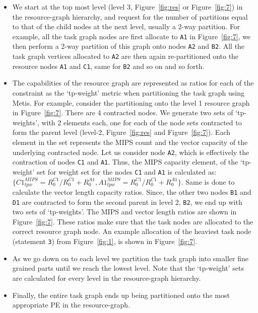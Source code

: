 \begin{itemize}

\item We start at the top most level (level 3, Figure~\ref{fig:res} or
  Figure~\ref{fig:7}) in the resource-graph hierarchy, and request for
  the number of partitions equal to that of the child nodes at the next
  level, usually a 2-way partition. For example, all the task graph
  nodes are first allocate to \texttt{A1} in Figure~\ref{fig:7}, we then
  perform a 2-way partition of this graph onto nodes \texttt{A2} and
  \texttt{B2}. All the task graph vertices allocated to \texttt{A2} are
  then again re-partitioned onto the resource nodes \texttt{A1} and
  \texttt{C1}, same for \texttt{B2} and so on and so forth.

\item The capabilities of the resource graph are represented as ratios
  for each of the constraint as the `tp-weight' metric when partitioning
  the task graph using Metis. For example, consider the partitioning
  onto the level 1 resource graph in Figure~\ref{fig:7}. There are 4
  contracted nodes. We generate two sets of `tp-weights', with 2
  elements each, one for each of the node sets contracted to form the
  parent level (level-2, Figure~\ref{fig:res} and
  Figure~\ref{fig:7}). Each element in the set represents the MIPS count
  and the vector capacity of the underlying contracted node. Let us
  consider node \texttt{A2}, which is effectively the contraction of
  nodes \texttt{C1} and \texttt{A1}. Thus, the MIPS capacity element, of
  the `tp-weight' set for weight set for the nodes \texttt{C1} and
  \texttt{A1} is calculated as: {$\{C1^{MIPS}_{tpw} = R^{C1}_0/R^{C1}_0
    + R^{A1}_0, A1^{MIPS}_{tpw} = R^{C1}_0/R^{C1}_0 + R^{A1}_0\}$}. Same
  is done to calculate the vector length capacity ratios. Since, the
  other two nodes \texttt{B1} and \texttt{D1} are contracted to form the
  second parent in level 2, \texttt{B2}, we end up with two sets of
  `tp-weights'. The MIPS and vector length ratios are shown in
  Figure~\ref{fig:7}. These ratios make sure that the task nodes are
  allocated to the correct resource graph node. An example allocation of
  the heaviest task node (statement \texttt{3}) from Figure~\ref{fig:1},
  is shown in Figure~\ref{fig:7}.

\item As we go down on to each level we partition the task graph into
  smaller fine grained parts until we reach the lowest level. Note that
  the `tp-weight' sets are calculated for every level in the
  resource-graph hierarchy.

\item Finally, the entire task graph ends up being partitioned onto the
  most appropriate PE in the resource-graph.

\end{itemize}


